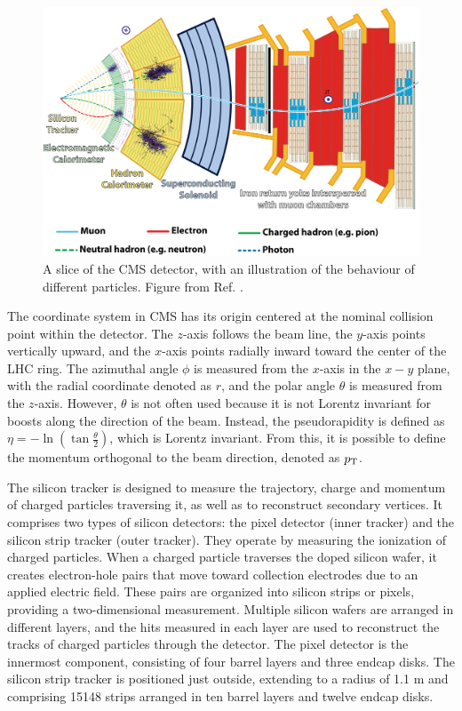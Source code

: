 \begin{figure}[!ht]
    \vspace*{-0.0cm}
    \centering
    \setlength{\mylength}{\textwidth}
    \includegraphics[width=0.85\mylength]{resources/CMS_slice.png}
    \vspace*{-0.0cm}
    \caption{A slice of the CMS detector, with an illustration of the behaviour of different particles. Figure from Ref. \cite{Barney:2120661}.}
    \label{fig:CMS_slice}
    \vspace*{-0.3cm}
\end{figure}

The coordinate system in CMS has its origin centered at the nominal collision point within the detector. The $z$-axis follows the beam line, the $y$-axis points vertically upward, and the $x$-axis points radially inward toward the center of the LHC ring. The azimuthal angle $\phi$ is measured from the $x$-axis in the $x-y$ plane, with the radial coordinate denoted as $r$, and the polar angle $\theta$ is measured from the $z$-axis. However, $\theta$ is not often used because it is not Lorentz invariant for boosts along the direction of the beam. Instead, the pseudorapidity is defined as $\eta = -\ln{\left(\tan{\frac{\theta}{2}}\right)}$, which is Lorentz invariant. From this, it is possible to define the momentum orthogonal to the beam direction, denoted as $p_\text{T}$.

The silicon tracker is designed to measure the trajectory, charge and momentum of charged particles traversing it, as well as to reconstruct secondary vertices. It comprises two types of silicon detectors: the pixel detector (inner tracker) and the silicon strip tracker (outer tracker). They operate by measuring the ionization of charged particles. When a charged particle traverses the doped silicon wafer, it creates electron-hole pairs that move toward collection electrodes due to an applied electric field. These pairs are organized into silicon strips or pixels, providing a two-dimensional measurement. Multiple silicon wafers are arranged in different layers, and the hits measured in each layer are used to reconstruct the tracks of charged particles through the detector. The pixel detector is the innermost component, consisting of four barrel layers and three endcap disks. The silicon strip tracker is positioned just outside, extending to a radius of 1.1 m and comprising 15148 strips arranged in ten barrel layers and twelve endcap disks.

